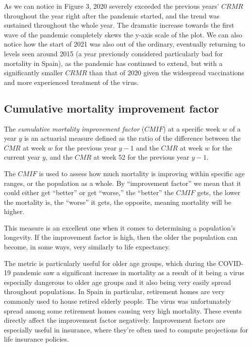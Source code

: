 \documentclass[
  a4paper]{article}
\begin{document}
As we can notice in Figure 3, 2020 severely exceeded the previous years'
\(CRMR\) throughout the year right after the pandemic started, and the
trend was sustained throughout the whole year. The dramatic increase
towards the first wave of the pandemic completely skews the y-axis scale
of the plot. We can also notice how the start of 2021 was also out of
the ordinary, eventually returning to levels seen around 2015 (a year
previously considered particularly bad for mortality in Spain), as the
pandemic has continued to extend, but with a significantly smaller
\(CRMR\) than that of 2020 given the widespread vaccinations and more
experienced treatment of the virus.

\newpage

\hypertarget{CMIF}{%
\subsection{Cumulative mortality improvement factor}\label{CMIF}}

The \emph{cumulative mortality improvement factor} (\(CMIF\)) at a
specific week \(w\) of a year \(y\) is an actuarial measure defined as
the ratio of the difference between the \(CMR\) at week \(w\) for the
previous year \(y-1\) and the \(CMR\) at week \(w\) for the current year
\(y\), and the \(CMR\) at week 52 for the previous year \(y-1\).

The \(CMIF\) is used to assess how much mortality is improving within
specific age ranges, or the population as a whole. By ``improvement
factor'' we mean that it could either get ``better'' or get ``worse,''
the ``better'' the \(CMIF\) gets, the lower the mortality is, the
``worse'' it gets, the opposite, meaning mortality will be higher.

This measure is an excellent one when it comes to determining a
population's longevity. If the improvement factor is high, then the
older the population can become, in some ways, very similarly to life
expectancy.

The metric is particularly useful for older age groups, which during the
COVID-19 pandemic saw a significant increase in mortality as a result of
it being a virus especially dangerous to older age groups and it also
being very easily spread throughout populations. In Spain in particular,
retirement homes are very commonly used to house retired elderly people.
The virus was unfortunately spread among some retirement homes causing
very high mortality. These events directly affect the improvement factor
negatively. Improvement factors are especially useful in insurance,
where they're often used to compute projections for life insurance
policies.
\end{document}
